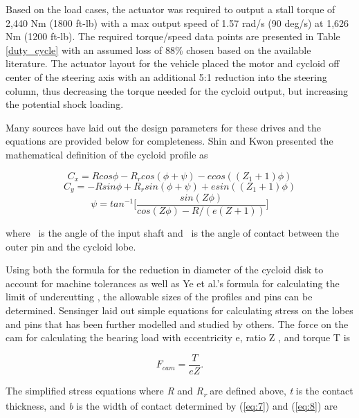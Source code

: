 Based on the load cases, the actuator was required to output a stall torque of 2,440 Nm (1800 ft-lb) with a max output speed of 1.57 rad/s (90 deg/s) at 1,626 Nm (1200 ft-lb).
The required torque/speed data points are presented in Table \ref{duty_cycle} with an assumed loss of 88\% chosen based on the available literature.
The actuator layout for the vehicle placed the motor and cycloid off center of the steering axis with an additional 5:1 reduction into the steering column, thus decreasing the torque needed for the cycloid output, but increasing the potential shock loading.


Many sources have laid out the design parameters for these drives and the equations are provided below for completeness.
Shin and Kwon \cite{on_the_lobe} presented the mathematical definition of the cycloid profile as

\begin{equation} \label{eq:1}
C_x = R cos\phi -R_r cos(\phi + \psi) - e cos((Z_1 + 1)\phi) 
\end{equation}
\begin{equation} \label{eq:2}
C_y = -R sin\phi + R_r sin(\phi + \psi) + e sin((Z_1 + 1)\phi) 
\end{equation}
\begin{equation} \label{eq:3}
\psi = tan^{-1} \lbrack\frac{sin(Z \phi)}{cos(Z \phi) - R / (e(Z + 1))}\rbrack 
\end{equation}

where \textphi\ is the angle of the input shaft and \textpsi\ is the angle of contact between the outer pin and the cycloid lobe.


Using both the formula for the reduction in diameter of the cycloid disk to account for machine tolerances \cite{machine_design} \cite{design_and_application} as well as Ye et al.'s formula for calculating the limit of undercutting \cite{ye}, the allowable sizes of the profiles and pins can be determined.
Sensinger \cite{unified_approach} laid out simple equations for calculating stress on the lobes and pins that has been further modelled and studied by others.
The force on the cam for calculating the bearing load with eccentricity e, ratio Z , and torque T is

\begin{equation} \label{eq:4}
F_{cam} = \frac{T}{e Z}.
\end{equation}

The simplified stress equations where \textit{R} and \textit{R\textsubscript{r}} are defined above, \textit{t} is the contact thickness, and \textit{b} is the width of contact determined by (\ref{eq:7}) and (\ref{eq:8}) are

